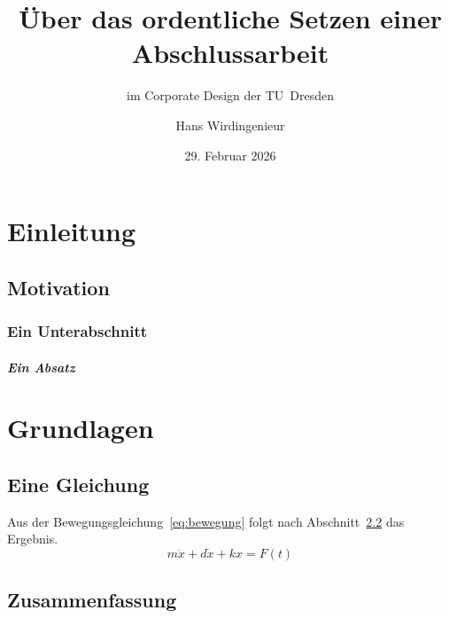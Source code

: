 \documentclass[
  output=digital,
  abstract={section,multiple,totoc},
  declaration={chapter,totoc},
]{tudcdthesis}
\institute{Institut für Typographie}
\title{Über das ordentliche Setzen einer Abschlussarbeit}
\subtitle{im Corporate Design der TU~Dresden}
\author{Hans Wirdingenieur}
\date{29. Februar 2026}
\begin{document}
\frontmatter
\maketitle

\begin{abstract}
  \blindtext
  \nextabstract[english,option=nottotoc]
  \blindtext
\end{abstract}



\begin{declarations}
  \confirmation
  \blocking[company=Heimlich GmbH] 
\end{declarations}

\tableofcontents

\mainmatter
\chapter{Einleitung}
\blindtext

\section{Motivation}
\blindtext[2]

\subsection{Ein Unterabschnitt}
\blindtext

\paragraph{Ein Absatz}
\blindtext

\chapter{Grundlagen}
\section{Eine Gleichung}
Aus der Bewegungsgleichung~\eqref{eq:bewegung} folgt nach Abschnitt~\ref{sec:schluss}
das Ergebnis.
\begin{equation}
  m\ddot{x} + d\dot{x} + kx = F(t)
  \label{eq:bewegung}
\end{equation}
\blindtext

\section{Zusammenfassung}
\label{sec:schluss}
\blindtext
\end{document}
